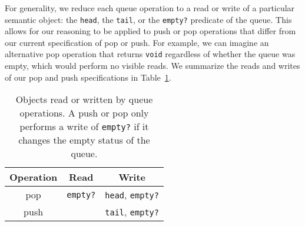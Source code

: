For generality, we reduce each queue operation to a read or write of a particular semantic object: the \texttt{head}, the \texttt{tail}, or the \texttt{empty?} predicate of the queue. This allows for our reasoning to be applied to push or pop operations that differ from our current specification of pop or push. For example, we can imagine an alternative pop operation that returns \texttt{void} regardless of whether the queue was empty, which would perform no visible reads. We summarize the reads and writes of our pop and push specifications in Table~\ref{table:qrw}.

\begin{table}[t]
\centering
\begin{tabular}{c||c|c}
    Operation & Read & Write\\
    \hline
    pop & \texttt{empty?} & \texttt{head}, \texttt{empty?}\\
    push & & \texttt{tail}, \texttt{empty?}\\
\end{tabular}
    \caption[Objects read or written by queue operations]{Objects read or written by queue operations. A push or pop only performs a write of \texttt{empty?} if it changes the empty status of the queue.}
    \label{table:qrw}
\end{table}

